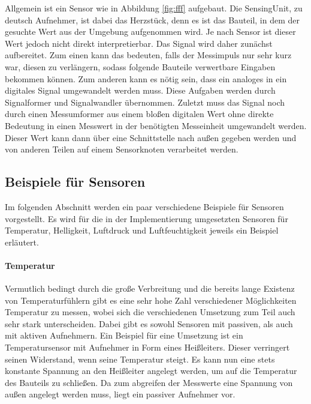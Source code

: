 


Allgemein ist ein Sensor wie in Abbildung \ref{fig:fff} aufgebaut. Die SensingUnit, zu deutsch Aufnehmer, ist dabei das Herzstück, denn es ist das Bauteil, in dem der gesuchte Wert aus der Umgebung aufgenommen wird. Je nach Sensor ist dieser Wert jedoch nicht direkt interpretierbar. Das Signal wird daher zunächst aufbereitet. Zum einen kann das bedeuten, falls der Messimpuls nur sehr kurz war, diesen zu verlängern, sodass folgende Bauteile verwertbare Eingaben bekommen können. Zum anderen kann es nötig sein, dass ein analoges in ein digitales Signal umgewandelt werden muss. Diese Aufgaben werden durch Signalformer und Signalwandler übernommen.\newline
Zuletzt muss das Signal noch durch einen Messumformer aus einem bloßen digitalen Wert ohne direkte Bedeutung in einen Messwert in der benötigten Messeinheit umgewandelt werden. Dieser Wert kann dann über eine Schnittstelle nach außen gegeben werden und von anderen Teilen auf einem Sensorknoten verarbeitet werden.

\subsection{Beispiele für Sensoren}

Im folgenden Abschnitt werden ein paar verschiedene Beispiele für Sensoren vorgestellt. Es wird für die in der Implementierung umgesetzten Sensoren für Temperatur, Helligkeit, Luftdruck und Luftfeuchtigkeit jeweils ein Beispiel erläutert.

\paragraph{Temperatur}

Vermutlich bedingt durch die große Verbreitung und die bereits lange Existenz von Temperaturfühlern gibt es eine sehr hohe Zahl verschiedener Möglichkeiten Temperatur zu messen, wobei sich die verschiedenen Umsetzung zum Teil auch sehr stark unterscheiden. Dabei gibt es sowohl Sensoren mit passiven, als auch mit aktiven Aufnehmern.\newline
Ein Beispiel für eine Umsetzung ist ein Temperatursensor mit Aufnehmer in Form eines Heißleiters. Dieser verringert seinen Widerstand, wenn seine Temperatur steigt. Es kann nun eine stets konstante Spannung an den Heißleiter angelegt werden, um auf die Temperatur des Bauteils zu schließen. Da zum abgreifen der Messwerte eine Spannung von außen angelegt werden muss, liegt ein passiver Aufnehmer vor.

